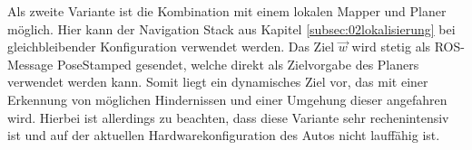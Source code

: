 Als zweite Variante ist die Kombination mit einem lokalen Mapper und Planer möglich. Hier kann der Navigation Stack aus Kapitel \ref{subsec:02lokalisierung} bei gleichbleibender Konfiguration verwendet werden. Das Ziel $\vec{w}$ wird stetig als ROS-Message PoseStamped gesendet, welche direkt als Zielvorgabe des Planers verwendet werden kann. Somit liegt ein dynamisches Ziel vor, das mit einer Erkennung von möglichen Hindernissen und einer Umgehung dieser angefahren wird. Hierbei ist allerdings zu beachten, dass diese Variante sehr rechenintensiv ist und auf der aktuellen Hardwarekonfiguration des Autos nicht lauffähig ist.
